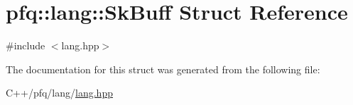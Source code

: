 \hypertarget{structpfq_1_1lang_1_1SkBuff}{\section{pfq\+:\+:lang\+:\+:Sk\+Buff Struct Reference}
\label{structpfq_1_1lang_1_1SkBuff}
}


{\ttfamily \#include $<$lang.\+hpp$>$}



The documentation for this struct was generated from the following file\+:\begin{DoxyCompactItemize}
\item 
C++/pfq/lang/\hyperlink{lang_8hpp}{lang.\+hpp}\end{DoxyCompactItemize}
